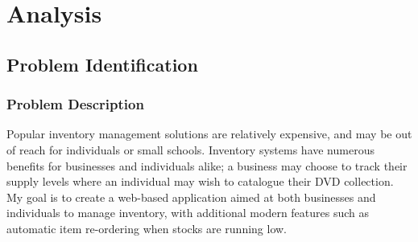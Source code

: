 \documentclass{article}
\title{\projectname}
\author{James Cahill}
\date{Sepetember 2023}
\begin{document}
\tableofcontents

\pagebreak

\section{Analysis}

\subsection{Problem Identification}

\subsubsection{Problem Description}

Popular inventory management solutions are relatively expensive, and may be out
of reach for individuals or small schools.
Inventory systems have numerous benefits for businesses and individuals alike; a business
may choose to track their supply levels where an individual may wish to catalogue their DVD collection. \\

\noindent My goal is to create a web-based application aimed at both businesses and individuals to manage
inventory, with additional modern features such as automatic item re-ordering when stocks are running low.\\
\end{document}
